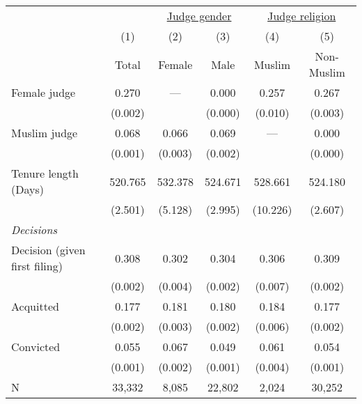 {
\def\sym#1{\ifmmode^{#1}\else\(^{#1}\)\fi}
\begin{tabular}{lccccc}
  \hline\hline
  && \multicolumn{2}{c}{\underline{Judge gender}} &  \multicolumn{2}{c}{\underline{Judge religion}} \\
  & (1) & (2) & (3) & (4) & (5) \\
 & Total & Female  & Male  & Muslim & Non-Muslim \\
  \hline
  Female judge & 0.270 & --- & 0.000 & 0.257  & 0.267 \\
  & (0.002)  &  & (0.000) & (0.010) &  (0.003) \\
  Muslim judge & 0.068 & 0.066 & 0.069 & ---  & 0.000 \\
  & (0.001) & (0.003) & (0.002) &  &  (0.000) \\
  Tenure length (Days) & 520.765 & 532.378 & 524.671 & 528.661  & 524.180 \\
   & (2.501) & (5.128) & (2.995) & (10.226) &  (2.607) \\
  \hline
  \multicolumn{5}{l}{\textit{Decisions}}\\  
  \hline
  Decision (given first filing) & 0.308  & 0.302 & 0.304 & 0.306  & 0.309 \\
  & (0.002) & (0.004) & (0.002) & (0.007) &  (0.002) \\
  Acquitted & 0.177 & 0.181 & 0.180 & 0.184  & 0.177 \\
  & (0.002) & (0.003) & (0.002) & (0.006) &  (0.002) \\
  Convicted & 0.055 & 0.067 & 0.049 & 0.061  & 0.054 \\
  & (0.001) & (0.002) & (0.001) & (0.004) &  (0.001) \\
  \hline
  N & 33,332 & 8,085 & 22,802 & 2,024 & 30,252 \\
  \hline\hline
\end{tabular}
}
